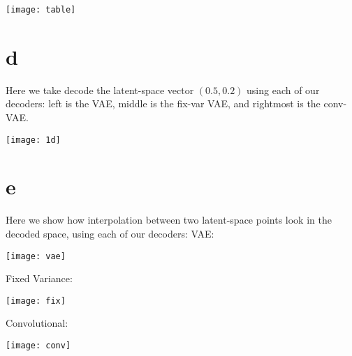 \documentclass[11pt]{article}
\begin{document}
\texttt{[image: table]}

\section*{d}
Here we take decode the latent-space vector $(0.5, 0.2)$ using each of our decoders:
left is the VAE, middle is the fix-var VAE, and rightmost is the conv-VAE.

\texttt{[image: 1d]}


\section*{e}
Here we show how interpolation between two latent-space points look in the decoded space, using each of our decoders:
VAE:

\texttt{[image: vae]}

Fixed Variance:

\texttt{[image: fix]}

Convolutional:

\texttt{[image: conv]}
\end{document}
